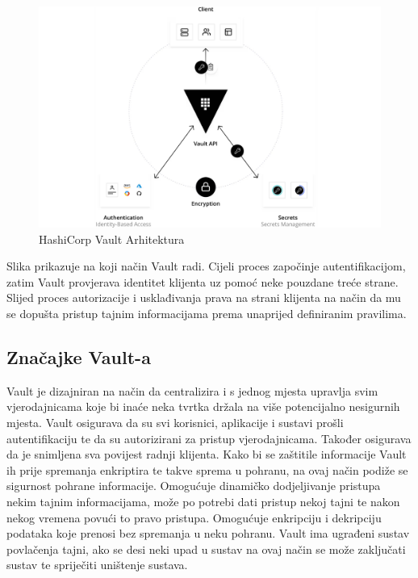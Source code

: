 \documentclass[]{foi}
\begin{document}
\begin{figure}[htbp]
    \centering
    \includegraphics[width=1.0\textwidth]{assets/hashicorp-arhitektura.png}
    \caption{HashiCorp Vault Arhitektura \cite{hashicorp-vault-what-is}}
\end{figure}

Slika prikazuje na koji način Vault radi.
Cijeli proces započinje autentifikacijom, zatim Vault provjerava identitet klijenta uz pomoć neke pouzdane treće strane.
Slijed proces autorizacije i usklađivanja prava na strani klijenta na način da mu se dopušta pristup tajnim informacijama prema unaprijed definiranim pravilima.

\pagebreak

\subsection{Značajke Vault-a}

Vault je dizajniran na način da centralizira i s jednog mjesta upravlja svim vjerodajnicama koje bi inaće neka tvrtka držala na više potencijalno nesigurnih mjesta.
Vault osigurava da su svi korisnici, aplikacije i sustavi prošli autentifikaciju te da su autorizirani za pristup vjerodajnicama.
Također osigurava da je snimljena sva povijest radnji klijenta.
Kako bi se zaštitile informacije Vault ih prije spremanja enkriptira te takve sprema u pohranu, na ovaj način podiže se sigurnost pohrane informacije.
Omogućuje dinamičko dodjeljivanje pristupa nekim tajnim informacijama, može po potrebi dati pristup nekoj tajni te nakon nekog vremena povući to pravo pristupa.
Omogućuje enkripciju i dekripciju podataka koje prenosi bez spremanja u neku pohranu.
Vault ima ugrađeni sustav povlačenja tajni, ako se desi neki upad u sustav na ovaj način se može zaključati sustav te spriječiti uništenje sustava.
\end{document}
